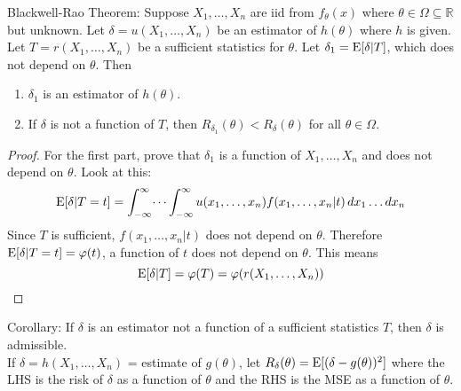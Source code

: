 \documentclass[12pt]{article}
\begin{document}
\begin{theorem} Blackwell-Rao Theorem: Suppose $X_1,\dots,X_n$ are iid from $f_\theta(x)$ where $\theta \in \Omega \subseteq \mathbb{R}$ but unknown. Let $\delta = u(X_1,\dots,X_n)$ be an estimator of $h(\theta)$ where $h$ is given. Let $T= r(X_1,\dots,X_n)$ be a sufficient statistics for $\theta$. Let $\delta_1 = \mathrm{E}[ \delta | T ]$, which does not depend on $\theta$. Then \begin{enumerate} 
\item $\delta_1$ is an estimator of $h(\theta)$. 
\item If $\delta$ is not a function of $T$, then $R_{\delta_1}(\theta) < R_\delta(\theta)$ for all $\theta \in \Omega$. \end{enumerate} \end{theorem} 
\begin{proof} For the first part, prove that $\delta_1$ is a function of $X_1,\dots,X_n$ and does not depend on $\theta$. Look at this: 
$$\mathrm{E}[ \delta | T=t ] = \int_{-\infty}^\infty \dots \int_{-\infty}^\infty u(x_1,\dots,x_n)f(x_1,\dots,x_n|t) \, dx_1\dots dx_n $$ 
Since $T$ is sufficient, $f(x_1,\dots,x_n|t)$ does not depend on $\theta$. Therefore $\mathrm{E}[ \delta | T=t ] = \varphi(t)$, a function of $t$ does not depend on $\theta$. This means $$\mathrm{E}[ \delta | T ] = \varphi(T) = \varphi(r(X_1,\dots,X_n))$$ \end{proof} 
Corollary: If $\delta$ is an estimator not a function of a sufficient statistics $T$, then $\delta$ is admissible. \\
If $\delta = h(X_1,\dots,X_n)$ = estimate of $g(\theta)$, let $R_\delta(\theta) = \mathrm{E}[ (\delta - g(\theta))^2 ]$ where the LHS is the risk of $\delta$ as a function of $\theta$ and the RHS is the MSE as a function of $\theta$. \\~\\
\end{document}
